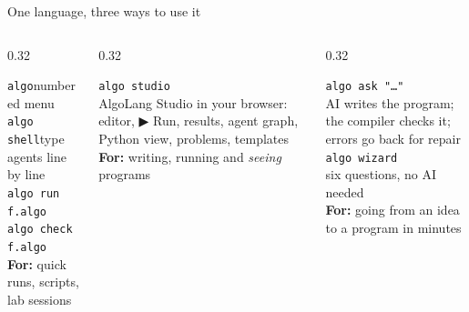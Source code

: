 \documentclass[aspectratio=169,11pt]{beamer}
\begin{document}
\begin{frame}{One language, three ways to use it}
\vspace{2mm}
\begin{columns}[T]
\begin{column}{0.32\textwidth}
\begin{tcolorbox}[enhanced,colback=teal!8,colframe=teal,arc=3pt,title={\bfseries 1 · Simple: command line},colbacktitle=teal,fontupper=\footnotesize\raggedright,height=55mm]
\texttt{algo}\enspace numbered menu\\[1mm]
\texttt{algo shell}\enspace type agents line by line\\[1mm]
\texttt{algo run f.algo}\\[1mm]
\texttt{algo check f.algo}\\[2mm]
\textbf{For:} quick runs, scripts, lab sessions
\end{tcolorbox}
\end{column}
\begin{column}{0.32\textwidth}
\begin{tcolorbox}[enhanced,colback=sky!8,colframe=sky,arc=3pt,title={\bfseries 2 · Graphical},colbacktitle=sky,fontupper=\footnotesize\raggedright,height=55mm]
\texttt{algo studio}\\[1mm]
AlgoLang Studio in your browser: editor, ▶ Run, results, agent graph, Python view, problems, templates\\[2mm]
\textbf{For:} writing, running and \emph{seeing} programs
\end{tcolorbox}
\end{column}
\begin{column}{0.32\textwidth}
\begin{tcolorbox}[enhanced,colback=rose!8,colframe=rose,arc=3pt,title={\bfseries 3 · Agentic},colbacktitle=rose,fontupper=\footnotesize\raggedright,height=55mm]
\texttt{algo ask "\dots"}\\AI writes the program; the compiler checks it; errors go back for repair\\[1mm]
\texttt{algo wizard}\\six questions, no AI needed\\[2mm]
\textbf{For:} going from an idea to a program in minutes
\end{tcolorbox}
\end{column}
\end{columns}
\vspace{1mm}
\end{frame}
\end{document}
